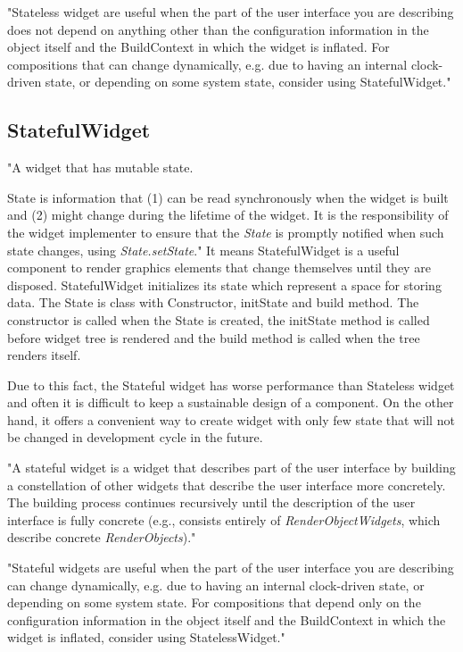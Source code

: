 "Stateless widget are useful when the part of the user interface you are describing does not depend on anything other than the configuration information in the object itself and the BuildContext in which the widget is inflated.
For compositions that can change dynamically, e.g. due to having an internal clock-driven state, or depending on some system state, consider using StatefulWidget."\cite{statelessWidget}


\subsection{StatefulWidget}\label{subsec:statefulwidget}
"A widget that has mutable state.

State is information that (1) can be read synchronously when the widget is built and (2) might change during the lifetime of the widget.
It is the responsibility of the widget implementer to ensure that the \textit{State}\cite{state} is promptly notified when such state changes, using \textit{State.setState}\cite{setState}."\cite{statefulWidget}
It means StatefulWidget is a useful component to render graphics elements that change themselves until they are disposed.
StatefulWidget initializes its state which represent a space for storing data.
The State is class with Constructor, initState and build method.
The constructor is called when the State is created, the initState method is called before widget tree is rendered and the build method is called when the tree renders itself.

Due to this fact, the Stateful widget has worse performance than Stateless widget and often it is difficult to keep a sustainable design of a component.
On the other hand, it offers a convenient way to create widget with only few state that will not be changed in development cycle in the future.

"A stateful widget is a widget that describes part of the user interface by building a constellation of other widgets that describe the user interface more concretely.
The building process continues recursively until the description of the user interface is fully concrete (e.g., consists entirely of
\textit{RenderObjectWidgets}\cite{renderObjectWidget}, which describe concrete \textit{RenderObjects}\cite{renderObject})."\cite{statefulWidget}


"Stateful widgets are useful when the part of the user interface you are describing can change dynamically, e.g. due to having an internal clock-driven state, or depending on some system state.
For compositions that depend only on the configuration information in the object itself and the BuildContext in which the widget is inflated, consider using StatelessWidget."\cite{statefulWidget}


